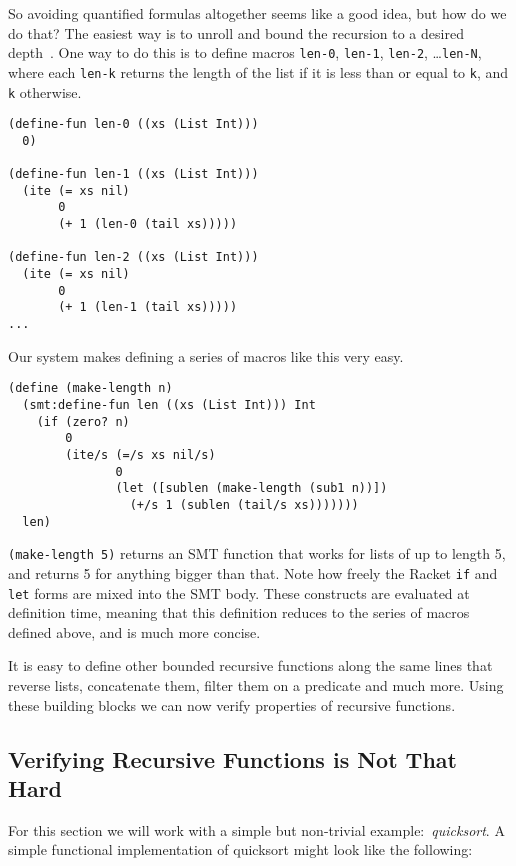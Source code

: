 So avoiding quantified formulas altogether seems like a good idea, but how do
we do that? The easiest way is to unroll and bound the recursion to a desired
depth~\cite{sat-recursive}. One way to do this is to define macros
\texttt{len-0}, \texttt{len-1}, \texttt{len-2}, \ldots \texttt{len-N}, where
each \texttt{len-k} returns the length of the list if it is less than or equal
to \texttt{k}, and \texttt{k} otherwise.

\begin{verbatim}
(define-fun len-0 ((xs (List Int)))
  0)

(define-fun len-1 ((xs (List Int)))
  (ite (= xs nil)
       0
       (+ 1 (len-0 (tail xs)))))

(define-fun len-2 ((xs (List Int)))
  (ite (= xs nil)
       0
       (+ 1 (len-1 (tail xs)))))
...
\end{verbatim}

Our system makes defining a series of macros like this very easy.

\begin{verbatim}
(define (make-length n)
  (smt:define-fun len ((xs (List Int))) Int
    (if (zero? n)
        0
        (ite/s (=/s xs nil/s)
               0
               (let ([sublen (make-length (sub1 n))])
                 (+/s 1 (sublen (tail/s xs)))))))
  len)
\end{verbatim}

\texttt{(make-length 5)} returns an SMT function that works for lists of up to
length 5, and returns 5 for anything bigger than that. Note how freely the
Racket \texttt{if} and \texttt{let} forms are mixed into the SMT body. These
constructs are evaluated at definition time, meaning that this definition
reduces to the series of macros defined above, and is much more concise.

It is easy to define other bounded recursive functions along the same lines
that reverse lists, concatenate them, filter them on a predicate and much
more. Using these building blocks we can now verify properties of recursive
functions.

\subsection{Verifying Recursive Functions is Not That Hard}

For this section we will work with a simple but non-trivial
example:~\textit{quicksort}. A simple functional implementation of quicksort
might look like the following:

